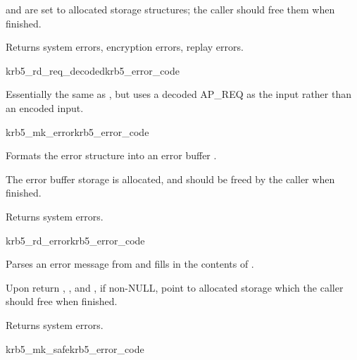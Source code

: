  and
 are set to allocated storage
structures; the caller should free them when finished.

Returns system errors, encryption errors, replay errors.

\begin{funcdecl}{krb5_rd_req_decoded}{krb5_error_code}{\funcin}
\funcendfuncarg
{}
\funcout
{}
\end{funcdecl}

Essentially the same as , but uses a decoded AP_REQ
as the input rather than an encoded input.

\begin{funcdecl}{krb5_mk_error}{krb5_error_code}{\funcin}
\funcout
{}
\end{funcdecl}

Formats the error structure  into an error buffer
.

The error buffer storage is allocated, and should be freed by the
caller when finished.

Returns system errors.

\begin{funcdecl}{krb5_rd_error}{krb5_error_code}{\funcin}
\funcout
{}
\end{funcdecl}

Parses an error message from  and fills in the
contents of .

Upon return ,
, and
, if non-NULL, point to allocated
storage which the caller should free when finished.

Returns system errors.

\begin{funcdecl}{krb5_mk_safe}{krb5_error_code}{\funcin}
\funcout
{}
\end{funcdecl}

